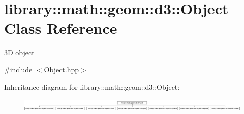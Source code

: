 \hypertarget{classlibrary_1_1math_1_1geom_1_1d3_1_1_object}{}\section{library\+:\+:math\+:\+:geom\+:\+:d3\+:\+:Object Class Reference}
\label{classlibrary_1_1math_1_1geom_1_1d3_1_1_object}


3D object  




{\ttfamily \#include $<$Object.\+hpp$>$}

Inheritance diagram for library\+:\+:math\+:\+:geom\+:\+:d3\+:\+:Object\+:\begin{figure}[H]
\begin{center}
\leavevmode
\includegraphics[height=0.653061cm]{classlibrary_1_1math_1_1geom_1_1d3_1_1_object}
\end{center}
\end{figure}
